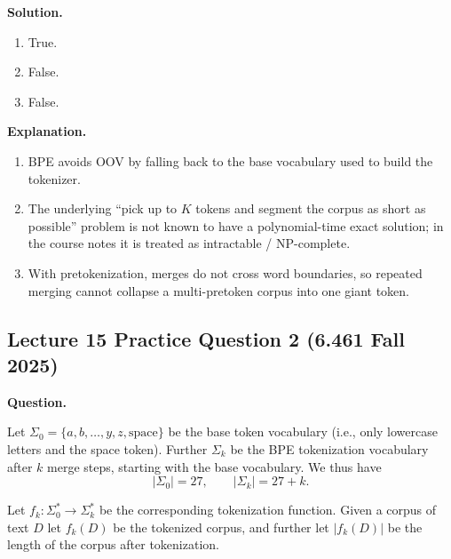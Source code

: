 \documentclass[10pt]{article}
\begin{document}
\textbf{Solution.}
\begin{enumerate}
\item True.
\item False.
\item False.
\end{enumerate}

\textbf{Explanation.}
\begin{enumerate}
\item BPE avoids OOV by falling back to the base vocabulary used to build the tokenizer.
\item The underlying ``pick up to \(K\) tokens and segment the corpus as short as possible'' problem is not known to have a polynomial-time exact solution; in the course notes it is treated as intractable / NP-complete.
\item With pretokenization, merges do not cross word boundaries, so repeated merging cannot collapse a multi-pretoken corpus into one giant token.
\end{enumerate}

\subsection*{Lecture 15 Practice Question 2 (6.461 Fall 2025)}
\textbf{Question.}

Let \(\Sigma_0 = \{a,b,\ldots,y,z,\text{space}\}\) be the base token vocabulary (i.e., only lowercase letters and the space
token). Further \(\Sigma_k\) be the BPE tokenization vocabulary after \(k\) merge steps, starting with the
base vocabulary. We thus have
\[
|\Sigma_0|=27,
\qquad
|\Sigma_k|=27+k.
\]

Let \(f_k : \Sigma_0^\ast \to \Sigma_k^\ast\) be the corresponding tokenization function. Given a corpus of text \(D\) let \(f_k(D)\)
be the tokenized corpus, and further let \(|f_k(D)|\) be the length of the corpus after tokenization.
\end{document}
